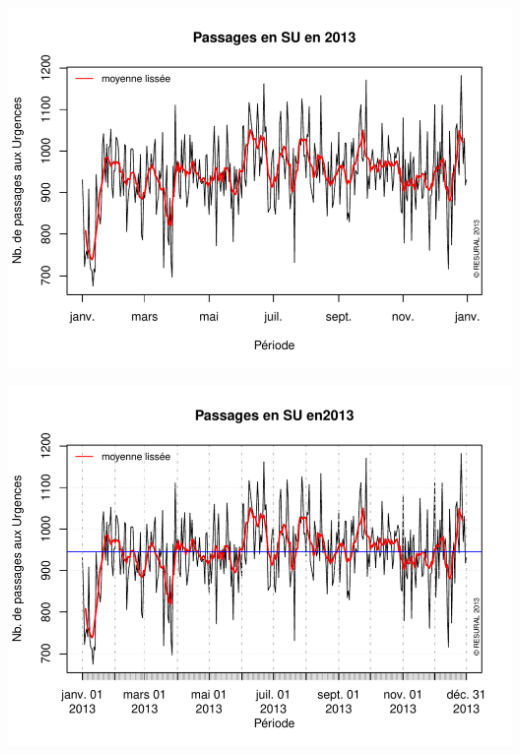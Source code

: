 \documentclass[12pt,english,french,twoside]{book}\usepackage[]{graphicx}\usepackage[]{color}
\makeatletter
\def\maxwidth{ %
  \ifdim\Gin@nat@width>\linewidth
    \linewidth
  \else
    \Gin@nat@width
  \fi
}
\newenvironment{knitrout}{}{} %
\makeatother
\begin{document}
\begin{center}
\begin{knitrout}
\color{fgcolor}
\includegraphics[width=\maxwidth]{figure/activite_plot} 

\end{knitrout}

\label{fig:activite_plot}
\end{center}



\begin{center}
\begin{knitrout}
\color{fgcolor}
\includegraphics[width=\maxwidth]{figure/activite_plot2} 

\end{knitrout}

\label{fig:activite_plot2}
\end{center}
\end{document}
